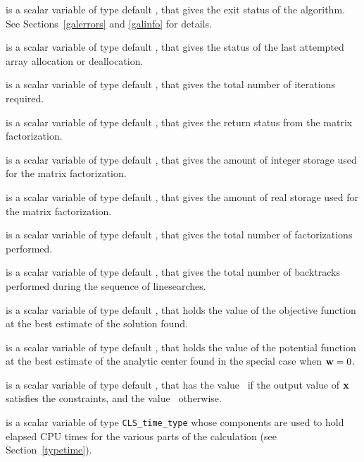\documentclass{galahad}
\newcommand{\packagename}{CLS}
\begin{document}
\begin{description}

 is a scalar variable of type default \integer, that gives the
exit status of the algorithm. See Sections~\ref{galerrors} and \ref{galinfo}
for details.

 is a scalar variable of type default \integer, that gives 
the status of the last attempted array allocation or deallocation.

 is a scalar variable of type default \integer, that gives the
total number of iterations required.

 is a scalar variable of type default \integer, that 
gives the return status from the matrix factorization.

 is a scalar variable of type default 
\integer, that gives the amount of integer storage used for the matrix 
factorization.

 is a scalar variable of type default \integer, 
that gives the amount of real storage used for the matrix factorization.

 is a scalar variable of type default \integer, that gives the
total number of factorizations performed.

 is a scalar variable of type default \integer, that gives the
total number of backtracks performed during the sequence of linesearches.

 is a scalar variable of type default \realdp, that holds the
value of the objective function at the best estimate of the solution found.

 is a scalar variable of type default \realdp, that holds the
value of the potential function at the best estimate of the analytic center 
found in the special case when ${\mathbf{w}} = 0$.

 is a scalar variable of type default \logical, that has the
value \true\ if the output value of ${\mathbf{x}}$ satisfies the constraints,
and the value \false\ otherwise.

 is a scalar variable of type {\tt \packagename\_time\_type} whose 
components are used to hold elapsed CPU times for the various parts of the 
calculation (see Section~\ref{typetime}).

\end{description}

\end{document}
